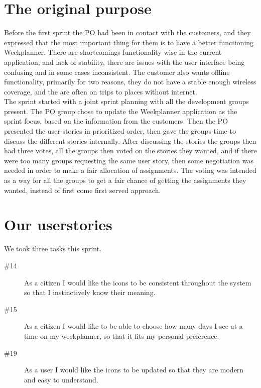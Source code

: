 \section{The original purpose}
Before the first sprint the \gls{PO} had been in contact with the customers, and they expressed that the most important thing for them is to have a better functioning Weekplanner.
There are shortcomings functionality wise  in the current application, and lack of stability, there are issues with the user interface being confusing and in some cases inconsistent. The customer also wants offline functionality, primarily for two reasons, they do not have a stable enough wireless coverage, and the are often on trips to places without internet.
\\
The sprint started with a joint sprint planning with all the development groups present. The \gls{PO} group chose to update the Weekplanner application as the sprint focus, based on the information from the customers. Then the \gls{PO} presented the user-stories in prioritized order, then gave the groups time to discuss the different stories internally. After discussing the stories the groups then had three votes, all the groups then voted on the stories they wanted, and if there were too many groups requesting the same user story, then some negotiation was needed in order to make a fair allocation of assignments. The voting was intended as a way for all the groups to get a fair chance of getting the assignments they wanted, instead of first come first served approach.\newline

\section{Our userstories}
We took three tasks this sprint.
\begin{description}
    \item [\#14] As a citizen I would like the icons to be consistent throughout the system so that I instinctively know their meaning.
    \item [\#15] As a citizen I would like to be able to choose how many days I see at a time on my weekplanner, so that it fits my personal preference.
    \item [\#19] As a user I would like the icons to be updated so that they are modern and easy to understand.
\end{description}

